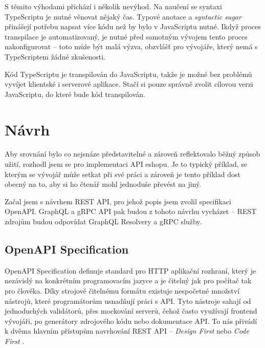 \documentclass[thesis=M,czech]{FITthesis}[2019/12/23]
\begin{document}
S těmito výhodami přichází i několik nevýhod. Na naučení se syntaxi TypeScriptu je nutné věnovat nějaký čas. Typové anotace a \textit{syntactic sugar} přinášejí potřebu napsat více kódu než by bylo v JavaScriptu nutné. Ikdyž proces transpilace je automatizovaný, je nutné před samotným vývojem tento proces nakonfigurovat -- toto může být malá výzva, obzvlášť pro vývojáře, který nemá s TypeScriptem žádné zkušenosti.

Kód TypeScriptu je transpilován do JavaScriptu, takže je možné bez problémů vyvíjet klientské i serverové aplikace. Stačí si pouze správně zvolit cílovou verzi JavaScriptu, do které bude kód transpilován.

\chapter{Návrh}
Aby srovnání bylo co nejsnáze představitelné a zároveň reflektovalo běžný způsob užití, rozhodl jsem se pro implementaci API eshopu. Je to typický příklad, se kterým se vývojář může setkat při své práci a zároveň je tento příklad dost obecný na to, aby si ho čtenář mohl jednoduše převést na jiný. 

Začal jsem s návrhem REST API, pro jehož popis jsem zvolil specifikaci OpenAPI. GraphQL a gRPC API pak budou z tohoto návrhu vycházet -- REST zdrojům budou odpovídat GraphQL Resolvery a gRPC služby.

\section{OpenAPI Specification}
OpenAPI Specification definuje standard pro HTTP aplikační rozhraní, který je nezávislý na konkrétním programovacím jazyce a je čitelný jak pro počítač tak pro člověka.
Díky strojově čitelnému formátu existuje nespočetné množství nástrojů, které programátorům usnadňují práci s API. Tyto nástroje sahají od jednoduchých validátorů, přes mockování serverů, čehož často využívají frontend vývojáři, po generátory zdrojového kódu nebo dokumentace API. To nás přivádí k dvěma hlavním přístupům navrhování REST API -- \textit{Design First} nebo \textit{Code First} \cite{api_design_approach}.
\end{document}
